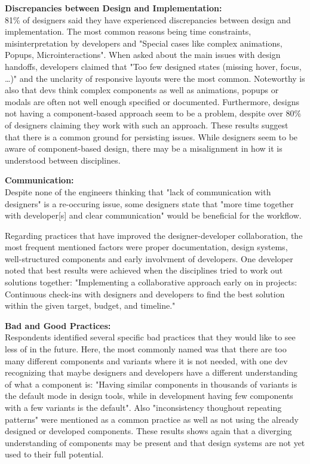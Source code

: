 \textbf{Discrepancies between Design and Implementation:}\\
81\% of designers said they have experienced discrepancies between design and implementation. The
most common reasons being time constraints, misinterpretation by developers and "Special cases like
complex animations, Popups, Microinteractions". When asked about the main issues with design
handoffs, developers claimed that "Too few designed states (missing hover, focus, \dots)" and
the unclarity of responsive layouts were the most common. Noteworthy is also that devs think complex
components as well as animations, popups or modals are often not well enough specified or
documented. Furthermore, designs not having a component-based approach seem to be a problem, despite
over 80\% of designers claiming they work with such an approach.
These results suggest that there is a common ground for persisting issues. While designers seem to
be aware of component-based design, there may be a misalignment in how it is understood between
disciplines.

\textbf{Communication:}\\
Despite none of the engineers thinking that "lack of communication with designers" is a re-occuring
issue, some designers state that "more time together with developer[s] and clear communication"
would be beneficial for the workflow.

Regarding practices that have improved the designer-developer collaboration, the most frequent
mentioned factors were proper documentation, design systems, well-structured components and early
involvment of developers. One developer noted that best results were achieved when the disciplines
tried to work out solutions together:
"Implementing a collaborative approach early on in projects: Continuous check-ins with designers and
developers to find the best solution within the given target, budget, and timeline."

\textbf{Bad and Good Practices:}\\
Respondents identified several specific bad practices that they would like to see less of in the
future. Here, the most commonly named was that there are too many different components and variants
where it is not needed, with one dev recognizing that maybe designers and developers have a
different understanding of what a component is: "Having similar components in thousands of variants
is the default mode in design tools, while in development having few components with a few variants
is the default". Also "inconsistency thoughout repeating patterns" were mentioned as a common
practice as well as not using the already designed or developed components. These results shows
again that a diverging understanding of components may be present and that design systems are not
yet used to their full potential.

